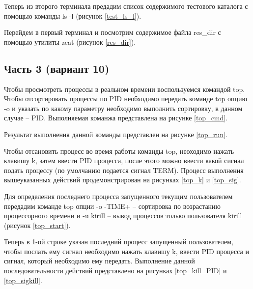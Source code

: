 Теперь из второго терминала предадим список содержимого тестового каталога с помощью команды ls -l (рисунок \ref{test_ls_l}).


Перейдем в первый терминал и посмотрим содержимое файла res\_dir с помощью утилиты zcat (рисунок \ref{res_dir}).


\subsection{Часть 3 (вариант 10)}

Чтобы просмотреть процессы в реальном времени воспользуемся командой top. Чтобы отсортировать процессы по PID необходимо передать команде top опцию -o и указать по какому параметру необходимо выполнить сортировку, в данном случае -- PID. Выполняемая команжа представлена на рисунке \ref{top_cmd}.


Результат выполнения данной команды представлен на рисунке \ref{top_run}. 


Чтобы отсановить процесс во время работы команды top, неоходимо нажать клавишу k, затем ввести PID процесса, после этого можно ввести какой сигнал подать процессу (по умолчанию подается сигнал TERM). Процесс выполнения вышеуказанных действий продемонстрирован на рисунках \ref{top_k} и \ref{top_sig}.


Для определения последнего процесса запущенного текущим пользователем передадим команде top опции -o -TIME+ -- сортировка по возрастанию процессорного времени и -u kirill -- вывод процессов только пользователя kirill (рисунок \ref{top_start}).

Теперь в 1-ой строке указан последний процесс запущенный пользователем, чтобы послать ему сигнал необходимо нажать клавишу k, ввести PID процесса и сигнал, который необходимо ему передать. Выполнение данной последовательности действий представлено на рисунках \ref{top_kill_PID} и \ref{top_sigkill}.

